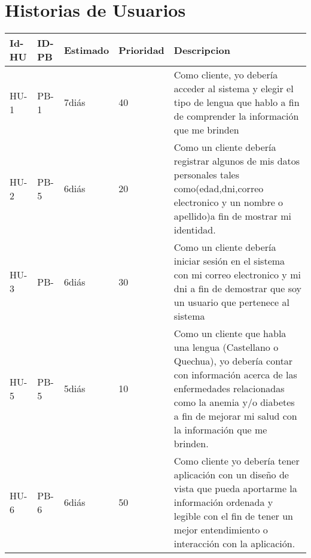 \chapter{Historias de Usuarios}
\begin{table}[htbp]
	\begin{center}
		\begin{tabular}{| p{1.6cm}| p{1.8cm}| p{1.8cm}|p{1.8cm} |p{7.8cm} |}
			\hline
		\textbf{Id-HU} & \textbf{ID-PB} & \textbf {Estimado}& \textbf{Prioridad} & \textbf{Descripcion}
		\\\hline  
 		HU-1&PB-1& 7diás& 40&Como cliente, yo debería acceder al sistema y elegir el tipo de lengua que hablo a fin de comprender la información que me brinden
 \\ \hline
 	 	HU-2&PB-5& 6diás& 20&Como un cliente debería registrar algunos de mis datos personales tales como(edad,dni,correo electronico y un nombre o apellido)a fin de mostrar mi identidad.
 	 	 \\ \hline
 	 	HU-3&PB-& 6diás& 30&Como un cliente debería iniciar sesión en el sistema con mi correo electronico y mi dni a fin de demostrar que soy un usuario que pertenece al sistema 
 \\ \hline
	 	HU-5&PB-5& 5diás& 10&Como un cliente que habla una lengua (Castellano o Quechua), yo debería contar con información acerca de las enfermedades relacionadas como la anemia y/o diabetes a fin de mejorar mi salud con la información que me brinden. 
 \\ \hline
 		HU-6&PB-6& 6diás&50&Como cliente yo debería tener aplicación con un diseño de vista que pueda aportarme la información ordenada y legible con el fin de tener un mejor entendimiento o interacción con la aplicación.
  \\ \hline
		\end{tabular}
\end{center}
\end{table}